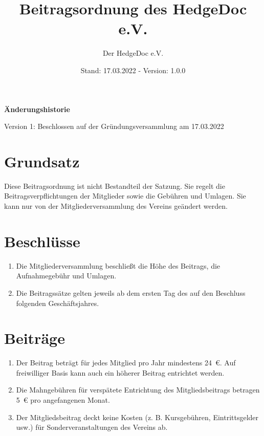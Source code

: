 \documentclass[12pt,paper=a4,ngerman]{scrreprt}
\author{Der HedgeDoc e.V.}
\title{Beitragsordnung des HedgeDoc e.V.}
\date{Stand: 17.03.2022 - Version: 1.0.0}
\begin{document}
	\maketitle
	
	\textbf{Änderungshistorie}
	\begin{description}
		\item
			Version 1: Beschlossen auf der Gründungsversammlung am 17.03.2022
	\end{description}
	\newpage
	
	\section{Grundsatz}
    	Diese Beitragsordnung ist nicht Bestandteil der Satzung. Sie regelt die Beitragsverpflichtungen der Mitglieder sowie die Gebühren und Umlagen. Sie kann nur von der Mitgliederversammlung des Vereins geändert werden.
	
	\section{Beschlüsse}
	\begin{enumerate}
	    \item
    	    Die Mitgliederversammlung beschließt die Höhe des Beitrags, die Aufnahmegebühr und Umlagen.
        \item 
    	    Die Beitragssätze gelten jeweils ab dem ersten Tag des auf den Beschluss folgenden Geschäftsjahres.
    \end{enumerate}
    	    
    \section{Beiträge}
    \begin{enumerate}
        \item
            Der Beitrag beträgt für jedes Mitglied pro Jahr mindestens 24 €. Auf freiwilliger Basis kann auch ein höherer Beitrag entrichtet werden.
        \item
            \label{sec:beiträge:mahngebühren}
            Die Mahngebühren für verspätete Entrichtung des Mitgliedsbeitrags betragen 5 € pro angefangenen Monat.
        \item
            Der Mitgliedsbeitrag deckt keine Kosten (z. B. Kursgebühren, Eintrittsgelder usw.) für Sonderveranstaltungen des Vereins ab.
    \end{enumerate}
    	    
\end{document}

